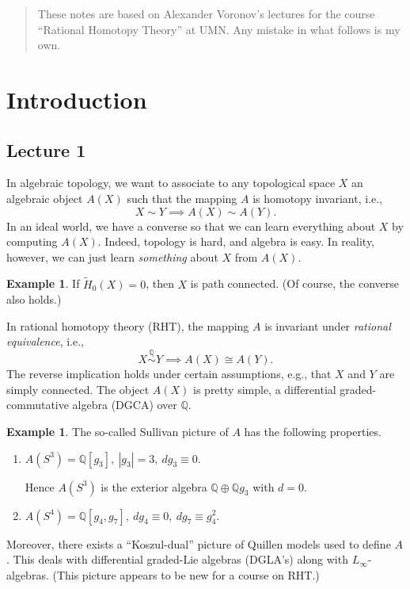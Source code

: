 \documentclass[10pt,letterpaper,cm]{nupset}
\theoremstyle{definition}
\newtheorem{exmp}[defn]{Example}
\theoremstyle{theorem}
\theoremstyle{remark}
\newcommand{\Q}{\mathbb Q}
\newcommand{\1}{\mathbb{1}}
\newcommand{\0}{\vec 0}
\newcommand{\be}{\begin{enumerate}}
\newcommand{\ee}{\end{enumerate}}
\begin{document}
\thispagestyle{empty}
\begin{abstract}
These notes are based on Alexander Voronov's lectures for the course ``Rational Homotopy Theory'' at UMN. Any mistake in what follows is my own.
\end{abstract}

\tableofcontents
\newpage

\section{Introduction} 

\subsection{Lecture 1}

In algebraic topology, we want to associate to any topological space $X$ an algebraic object $A(X)$ such that the mapping $A$ is homotopy invariant, i.e.,
\[
X \sim Y \implies A(X) \sim A(Y).
\]
In an ideal world, we have a converse so that we can learn everything about $X$ by computing $A(X)$. Indeed, topology is hard, and algebra is easy. In reality, however, we can just learn \emph{something} about $X$ from $A(X)$.

\begin{exmp}
If $\widetilde{H}_0(X) =0$, then $X$ is path connected. (Of course, the converse also holds.)
\end{exmp}

In rational homotopy theory (RHT), the mapping $A$ is invariant under \textit{rational equivalence}, i.e.,
\[
X \overset{\Q}{\sim} Y \implies A(X) \cong A(Y).
\] The reverse implication holds under certain assumptions, e.g., that $X$ and $Y$ are simply connected. The object $A(X)$ is pretty simple, a differential graded-commutative algebra (DGCA) over $\Q$.

\begin{exmp} The so-called Sullivan picture of $A$ has the following properties.  
\be
\item $A(S^3) = \Q\left[g_3\right], \ \left\lvert{g_3}\right\rvert =3, \ d{g_3} \equiv 0$. 

Hence $A(S^3)$ is the exterior algebra $\Q \oplus \Q{g_3}$ with $d=0$.
\item $A(S^4) = \Q\left[g_4, g_7\right], \ d{g_4} \equiv 0, \ d{g_7} \equiv g_4^2$.
\ee
\end{exmp}

Moreover, there exists a ``Koszul-dual'' picture of Quillen models used to define $A$. This deals with differential graded-Lie algebras (DGLA's) along with $L_{\infty}$-algebras. (This picture appears to be new for a course on RHT.)
\end{document}
